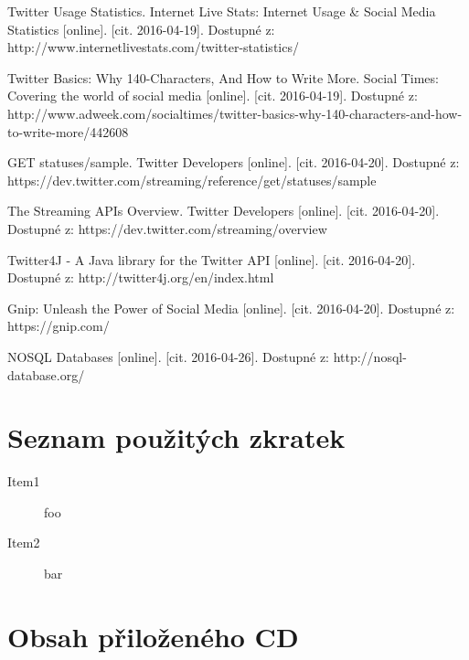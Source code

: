 \documentclass[thesis=B,czech]{FITthesis}[2012/06/26]
\begin{document}
\begin{thebibliography}{1}
Twitter Usage Statistics. Internet Live Stats: Internet Usage \& Social Media Statistics [online]. [cit. 2016-04-19]. Dostupné z: http://www.internetlivestats.com/twitter-statistics/

Twitter Basics: Why 140-Characters, And How to Write More. Social Times: Covering the world of social media [online]. [cit. 2016-04-19]. Dostupné z: http://www.adweek.com/socialtimes/twitter-basics-why-140-characters-and-how-to-write-more/442608

GET statuses/sample. Twitter Developers [online]. [cit. 2016-04-20]. Dostupné z: https://dev.twitter.com/streaming/reference/get/statuses/sample

The Streaming APIs Overview. Twitter Developers [online]. [cit. 2016-04-20]. Dostupné z: https://dev.twitter.com/streaming/overview

Twitter4J - A Java library for the Twitter API [online]. [cit. 2016-04-20]. Dostupné z: http://twitter4j.org/en/index.html

Gnip: Unleash the Power of Social Media [online]. [cit. 2016-04-20]. Dostupné z: https://gnip.com/

NOSQL Databases [online]. [cit. 2016-04-26]. Dostupné z: http://nosql-database.org/

  
\end{thebibliography}



\appendix

\chapter{Seznam použitých zkratek}
\begin{description}
	\item[Item1] foo
	\item[Item2] bar
\end{description}

\chapter{Obsah přiloženého CD}


\begin{figure}
\end{figure}
\end{document}
